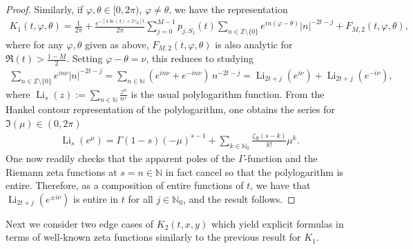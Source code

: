 \documentclass[letterpaper,10pt]{amsart}
\newcommand{\N}{\mathbb N}
\newcommand{\Z}{\mathbb Z}
\DeclareMathOperator{\Li}{Li}
\numberwithin{equation}{section}
\begin{document}
\begin{proof}
Similarly, if $\varphi,\theta\in[0,2\pi)$, $\varphi\neq\theta$, we have the representation
\begin{align}
    K_1(t,\varphi,\theta) = \frac{1}{2\pi}+\frac{e^{-[4\ln(2)+2\gamma_E] t}}{2\pi}\sum_{j=0}^{M-1}p_{j,S_1}(t)\sum_{n \in \Z\setminus\{0\}}e^{in(\varphi-\theta)}|n|^{-2t-j} + F_{M,2}(t,\varphi,\theta),
\end{align}
where for any $\varphi,\theta$ given as above, $F_{M,2}(t,\varphi,\theta)$ is also analytic for $\Re(t) > \frac{1-M}{2}$. Setting $\varphi-\theta = \nu$, this reduces to studying
\begin{align}
    \sum_{n\in \Z \setminus \{0\}} e^{in\nu}|n|^{-2t-j} = \sum_{n \in \N}(e^{in\nu }+e^{-in\nu})\,n^{-2t-j} = \Li_{2t+j}(e^{i\nu})+\Li_{2t+j}(e^{-i\nu}),
\end{align}
where $\Li_s(z) :=\sum_{n\in \N}\frac{z^n}{n^s}$ is the usual polylogarithm function. From the Hankel contour representation of the polylogarithm, one obtains the series for $\Im(\mu) \in (0,2\pi)$ \cite[Eq. 25.12.12]{DLMF}
\begin{align}
    \Li_s(e^\mu) = \Gamma(1-s)(-\mu)^{s-1}+\sum_{k\in \N_0}\frac{\zeta_R(s-k)}{k!}\mu^k.
\end{align}
One now readily checks that the apparent poles of the $\Gamma$-function and the Riemann zeta functions at $s=n\in\mathbb{N}$ in fact cancel so that the polylogarithm is entire. Therefore, as a composition of entire functions of $t$, we have that $\Li_{2t+j}(e^{\pm i\nu})$ is entire in $t$ for all $j \in \N_0$, and the result follows.
\end{proof}

Next we consider two edge cases of $K_2(t,x,y)$ which yield explicit formulas in terms of well-known zeta functions similarly to the previous result for $K_1$.
\end{document}
